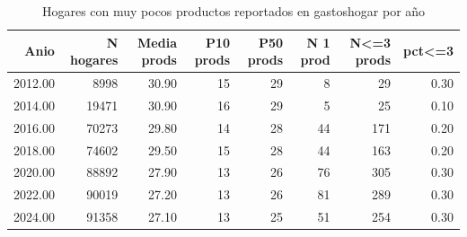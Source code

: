 \begin{table}[ht]
\centering
\caption{Hogares con muy pocos productos reportados en gastoshogar por a\~{n}o} 
\label{tab:06_hogares_pocos_productos}
\begin{tabular}{rrrrrrrr}
  \toprule
Anio & N hogares & Media prods & P10 prods & P50 prods & N 1 prod & N<=3 prods & pct<=3 \\ 
  \midrule
2012.00 & 8998 & 30.90 &  15 &  29 &   8 &  29 & 0.30 \\ 
  2014.00 & 19471 & 30.90 &  16 &  29 &   5 &  25 & 0.10 \\ 
  2016.00 & 70273 & 29.80 &  14 &  28 &  44 & 171 & 0.20 \\ 
  2018.00 & 74602 & 29.50 &  15 &  28 &  44 & 163 & 0.20 \\ 
  2020.00 & 88892 & 27.90 &  13 &  26 &  76 & 305 & 0.30 \\ 
  2022.00 & 90019 & 27.20 &  13 &  26 &  81 & 289 & 0.30 \\ 
  2024.00 & 91358 & 27.10 &  13 &  25 &  51 & 254 & 0.30 \\ 
   \bottomrule
\end{tabular}
\end{table}
